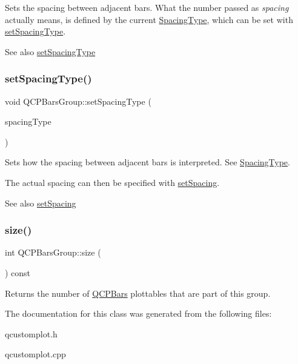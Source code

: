 Sets the spacing between adjacent bars. What the number passed as {\itshape spacing} actually means, is defined by the current \hyperlink{classQCPBarsGroup_a4c0521120a97e60bbca37677a37075b6}{Spacing\+Type}, which can be set with \hyperlink{classQCPBarsGroup_a2c7e2d61b10594a4555b615e1fcaf49e}{set\+Spacing\+Type}.

\begin{DoxySeeAlso}{See also}
\hyperlink{classQCPBarsGroup_a2c7e2d61b10594a4555b615e1fcaf49e}{set\+Spacing\+Type} 
\end{DoxySeeAlso}
\mbox{\label{classQCPBarsGroup_a2c7e2d61b10594a4555b615e1fcaf49e}} 
\subsubsection{\texorpdfstring{set\+Spacing\+Type()}{setSpacingType()}}
{\footnotesize\ttfamily void Q\+C\+P\+Bars\+Group\+::set\+Spacing\+Type (\begin{DoxyParamCaption}\item[{\hyperlink{classQCPBarsGroup_a4c0521120a97e60bbca37677a37075b6}{Spacing\+Type}}]{spacing\+Type }\end{DoxyParamCaption})}

Sets how the spacing between adjacent bars is interpreted. See \hyperlink{classQCPBarsGroup_a4c0521120a97e60bbca37677a37075b6}{Spacing\+Type}.

The actual spacing can then be specified with \hyperlink{classQCPBarsGroup_aa553d327479d72a0c3dafcc724a190e2}{set\+Spacing}.

\begin{DoxySeeAlso}{See also}
\hyperlink{classQCPBarsGroup_aa553d327479d72a0c3dafcc724a190e2}{set\+Spacing} 
\end{DoxySeeAlso}
\mbox{\label{classQCPBarsGroup_a3780ec77919cb00840207ec7a0f00dd5}} 
\subsubsection{\texorpdfstring{size()}{size()}}
{\footnotesize\ttfamily int Q\+C\+P\+Bars\+Group\+::size (\begin{DoxyParamCaption}{ }\end{DoxyParamCaption}) const\hspace{0.3cm}{\ttfamily [inline]}}

Returns the number of \hyperlink{classQCPBars}{Q\+C\+P\+Bars} plottables that are part of this group. 

The documentation for this class was generated from the following files\+:\begin{DoxyCompactItemize}
\item 
qcustomplot.\+h\item 
qcustomplot.\+cpp\end{DoxyCompactItemize}
